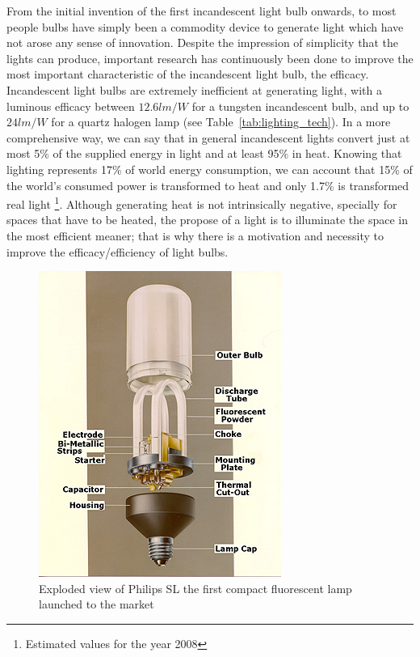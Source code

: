 From the initial invention of the first incandescent light bulb onwards, to most people bulbs have simply been a commodity device to generate light which have not arose any sense of innovation. Despite the impression of simplicity that the lights can produce, important research has continuously been done to improve the most important characteristic of the incandescent light bulb, the efficacy. Incandescent light bulbs are extremely inefficient at generating light, with a luminous efficacy between $12.6 lm/W$ for a tungsten incandescent bulb, and  up to $24 lm/W$ for a quartz halogen lamp (see Table~\ref{tab:lighting_tech}). In a more comprehensive way, we can say that in general incandescent lights convert just at most 5\% of the supplied energy in light and at least 95\% in heat. Knowing that lighting represents 17\% of world energy consumption, we can account that 15\% of the world's consumed power is transformed to heat and only 1.7\% is transformed real light \footnote{Estimated values for the year 2008}. Although generating heat is not intrinsically negative, specially for spaces that have to be heated, the propose of a light is to illuminate the space in the most efficient meaner; that is why there is a motivation and necessity to improve the efficacy/efficiency of light bulbs.

\begin{figure}[!h]
\centering
\includegraphics{./0_intro/img/phil1b.jpg}
\caption{Exploded view of Philips SL the first compact fluorescent lamp launched to the market~\cite{lib:Philips}}
\label{fig:philips_sl}
\end{figure}

